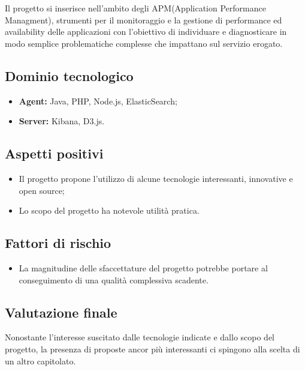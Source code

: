 \documentclass[openany,12pt,a4paper]{report}
\begin{document}
Il progetto si inserisce nell'ambito degli APM(Application Performance Managment), strumenti per il monitoraggio e la gestione di performance ed availability delle applicazioni con l’obiettivo di individuare e diagnosticare in modo semplice problematiche complesse che impattano sul servizio erogato.

\subsection{Dominio tecnologico}

\begin{itemize}
    \item \textbf{Agent:} Java, PHP, Node.js, ElasticSearch;
    
    \item \textbf{Server:} Kibana, D3.js.
\end{itemize}

\subsection{Aspetti positivi}

\begin{itemize}
    \item Il progetto propone l'utilizzo di alcune tecnologie interessanti, innovative e open source;
    
    \item Lo scopo del progetto ha notevole utilità pratica.
\end{itemize}

\subsection{Fattori di rischio}

\begin{itemize}
    \item La magnitudine delle sfaccettature del progetto potrebbe portare al conseguimento di una qualità complessiva scadente.
\end{itemize}

\subsection{Valutazione finale}

Nonostante l'interesse suscitato dalle tecnologie indicate e dallo scopo del progetto, la presenza di proposte ancor più interessanti ci spingono alla scelta di un altro capitolato.
\end{document}
